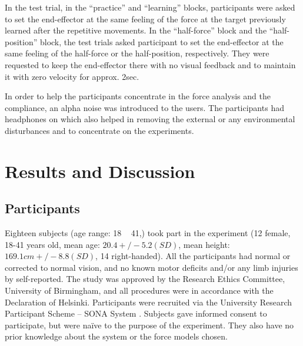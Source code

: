 In the test trial, in the “practice” and “learning” blocks, participants were asked to set the end-effector at the same feeling of the force at the target previously learned after the repetitive movements. In the “half-force” block and the “half-position” block, the test trials asked participant to set the end-effector at the same feeling of the half-force or the half-position, respectively. They were requested to keep the end-effector there with no visual feedback and to maintain it with zero velocity for approx. 2sec.

In order to help the participants concentrate in the force analysis and the compliance, an alpha noise was introduced to the users. The participants had headphones on which also helped in removing the external or any environmental disturbances and to concentrate on the experiments.

\section{Results and Discussion}
\subsection{Participants}
Eighteen subjects (age range: 18 ~ 41,) took part in the experiment (12 female, 18-41 years old, mean age: $20.4 +/- 5.2 (SD)$, mean height: $169.1 cm +/- 8.8 (SD)$, 14 right-handed). All the participants had normal or corrected to normal vision, and no known motor deficits and/or any limb injuries by self-reported. The study was approved by the Research Ethics Committee, University of Birmingham, and all procedures were in accordance with the Declaration of Helsinki. Participants were recruited via the University Research Participant Scheme – SONA System . Subjects gave informed consent to participate, but were naïve to the purpose of the experiment. They also have no prior knowledge about the system or the force models chosen.


